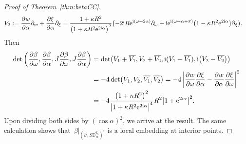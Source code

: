 \documentclass[pdftex]{sigma}
\numberwithin{equation}{section}
\theoremstyle{definition}
\newcommand{\1}{{\bf 1}}
\newcommand \Dm { \mathbb{D}}
\begin{document}
\begin{proof}[Proof of Theorem~\ref{thm:betaCC}]
\begin{align*}
		&V_2:= \frac{\partial w}{\partial\alpha}\partial_w + \frac{\partial\xi}{\partial\alpha} \partial_\xi = \frac{1+\kappa R^2}{\bigl(1+\kappa R^2 {\rm e}^{2{\rm i}\alpha}\bigr)^2} \bigl(-2{\rm i}R {\rm e}^{{\rm i}(\omega+2\alpha)} \partial_\omega + {\rm i} {\rm e}^{{\rm i}(\omega + \alpha+\pi)} \bigl(1-\kappa R^2 {\rm e}^{2{\rm i}\alpha}\bigr) \partial_\xi \bigr).
	\end{align*}
	Then
	\begin{align*}
		\det \left(\frac{\partial\beta}{\partial\omega}, \frac{\partial\beta}{\partial\alpha}, J \frac{\partial\beta}{\partial\omega}, J\frac{\partial\beta}{\partial\alpha}\right) &= \det \bigl(V_1 + \overline{V_1}, V_2 + \overline{V_2}, {\rm i} (V_1-\overline{V_1}), {\rm i} \bigl(V_2-\overline{V_2}\bigr)\bigr) \\
		&= -4 \det \bigl(V_1, V_2, \overline{V_1}, \overline{V_2}\bigr) = -4 \left| \frac{\partial w}{\partial\omega}\frac{\partial\xi}{\partial\alpha} - \frac{\partial w}{\partial\alpha} \frac{\partial\xi}{\partial\omega} \right|^2 \\
		&= -4 \frac{\bigl(1+\kappa R^2\bigr)^2}{\big|1+\kappa R^2 {\rm e}^{2{\rm i}\alpha}\big|^4} R^2 \big|1+{\rm e}^{2{\rm i}\alpha}\big|^2.
	\end{align*}
	Upon dividing both sides by $(\cos\alpha)^2$, we arrive at the result. The same calculation shows that~$\beta|_{(\partial_+ S\Dm_R^{g_\kappa})^\circ}$ is a local embedding at interior points.



\end{proof}
\end{document}
